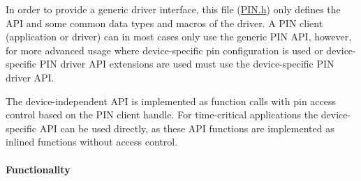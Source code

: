 In order to provide a generic driver interface, this file (\hyperlink{_p_i_n_8h}{P\+I\+N.\+h}) only defines the A\+P\+I and some common data types and macros of the driver. A P\+I\+N client (application or driver) can in most cases only use the generic P\+I\+N A\+P\+I, however, for more advanced usage where device-\/specific pin configuration is used or device-\/specific P\+I\+N driver A\+P\+I extensions are used must use the device-\/specific P\+I\+N driver A\+P\+I.

The device-\/independent A\+P\+I is implemented as function calls with pin access control based on the P\+I\+N client handle. For time-\/critical applications the device-\/specific A\+P\+I can be used directly, as these A\+P\+I functions are implemented as inlined functions without access control.

\paragraph*{Functionality}


